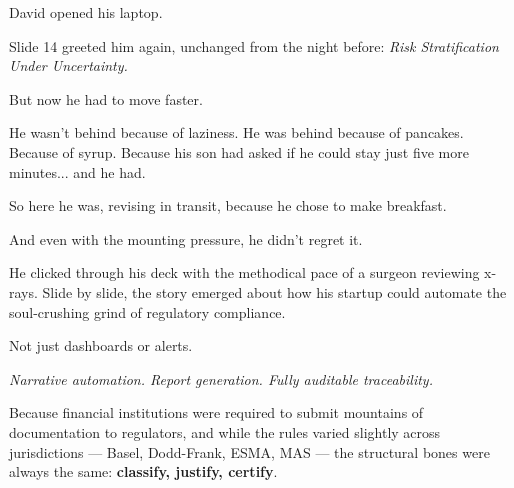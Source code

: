 David opened his laptop.

Slide 14 greeted him again, unchanged from the night before:
\textit{Risk Stratification Under Uncertainty.}

But now he had to move faster.

He wasn’t behind because of laziness. He was behind because of pancakes. Because of syrup. 
Because his son had asked if he could stay just five more minutes... and he had.

So here he was, revising in transit, because he chose to make breakfast.

And even with the mounting pressure, he didn’t regret it.

He clicked through his deck with the methodical pace of a surgeon reviewing x-rays. Slide by slide, the story emerged
about how his startup could automate the soul-crushing grind of regulatory compliance.

Not just dashboards or alerts.

\textit{Narrative automation. Report generation. Fully auditable traceability.}

Because financial institutions were required to submit mountains of documentation to regulators, and while the 
rules varied slightly across jurisdictions — Basel, Dodd-Frank, ESMA, MAS — the structural bones were always the same:
\textbf{classify, justify, certify}.

\medskip

